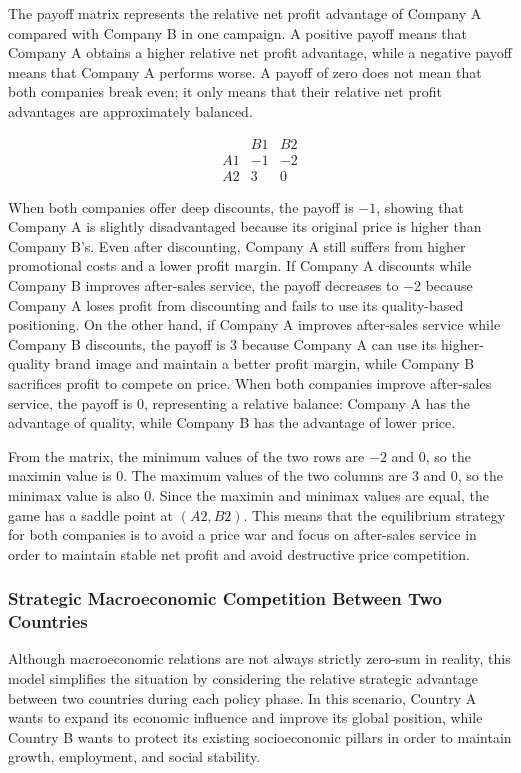 \documentclass[12pt,a4paper]{article}
\begin{document}
The payoff matrix represents the relative net profit advantage of Company A compared with Company B in one campaign. A positive payoff means that Company A obtains a higher relative net profit advantage, while a negative payoff means that Company A performs worse. A payoff of zero does not mean that both companies break even; it only means that their relative net profit advantages are approximately balanced.

\begingroup
\small
\renewcommand{\arraystretch}{0.75}
\setlength{\arraycolsep}{4pt}
\[
\begin{array}{c|cc}
 & B1 & B2\\
\hline
A1 & -1 & -2 \\
A2 & 3 & 0
\end{array}
\]
\endgroup

When both companies offer deep discounts, the payoff is $-1$, showing that Company A is slightly disadvantaged because its original price is higher than Company B's. Even after discounting, Company A still suffers from higher promotional costs and a lower profit margin. If Company A discounts while Company B improves after-sales service, the payoff decreases to $-2$ because Company A loses profit from discounting and fails to use its quality-based positioning. On the other hand, if Company A improves after-sales service while Company B discounts, the payoff is $3$ because Company A can use its higher-quality brand image and maintain a better profit margin, while Company B sacrifices profit to compete on price. When both companies improve after-sales service, the payoff is $0$, representing a relative balance: Company A has the advantage of quality, while Company B has the advantage of lower price.

From the matrix, the minimum values of the two rows are $-2$ and $0$, so the maximin value is $0$. The maximum values of the two columns are $3$ and $0$, so the minimax value is also $0$. Since the maximin and minimax values are equal, the game has a saddle point at $(A2,B2)$. This means that the equilibrium strategy for both companies is to avoid a price war and focus on after-sales service in order to maintain stable net profit and avoid destructive price competition.

\subsubsection{Strategic Macroeconomic Competition Between Two Countries}

Although macroeconomic relations are not always strictly zero-sum in reality, this model simplifies the situation by considering the relative strategic advantage between two countries during each policy phase. In this scenario, Country A wants to expand its economic influence and improve its global position, while Country B wants to protect its existing socioeconomic pillars in order to maintain growth, employment, and social stability.
\end{document}
